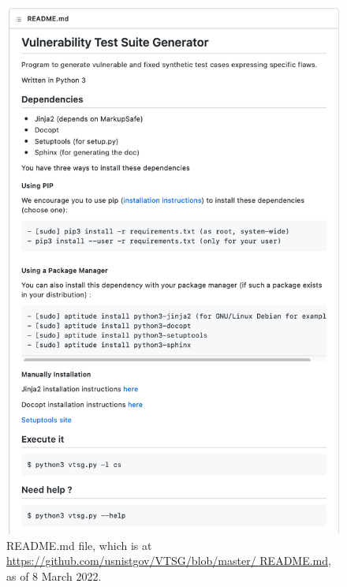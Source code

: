 \documentclass[12pt]{article}
\begin{document}
\begin{figure}[htbp]
  \includegraphics[width=0.8\linewidth]{fig_README.md.png}
  \caption{README.md file, which is at
    \href{https://github.com/usnistgov/VTSG/blob/master/README.md}
         {https://github.com/usnistgov/VTSG/blob/master/ README.md},
    as of 8 March 2022.}
  \label{fig:README.md file}
\end{figure}


\end{document}
